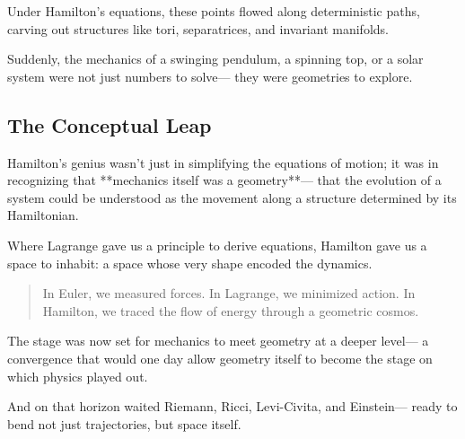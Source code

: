 Under Hamilton’s equations, these points flowed along deterministic paths,  
carving out structures like tori, separatrices, and invariant manifolds.

Suddenly, the mechanics of a swinging pendulum, a spinning top, or a solar system were not just numbers to solve—  
they were geometries to explore.

\bigskip

\subsection*{The Conceptual Leap}

Hamilton’s genius wasn’t just in simplifying the equations of motion;  
it was in recognizing that **mechanics itself was a geometry**—  
that the evolution of a system could be understood as the movement along a structure determined by its Hamiltonian.

Where Lagrange gave us a principle to derive equations,  
Hamilton gave us a space to inhabit:  
a space whose very shape encoded the dynamics.

\bigskip

\begin{quote}
In Euler, we measured forces.  
In Lagrange, we minimized action.  
In Hamilton, we traced the flow of energy through a geometric cosmos.
\end{quote}

The stage was now set for mechanics to meet geometry at a deeper level—  
a convergence that would one day allow geometry itself to become the stage on which physics played out.

And on that horizon waited Riemann, Ricci, Levi-Civita, and Einstein—  
ready to bend not just trajectories, but space itself.
